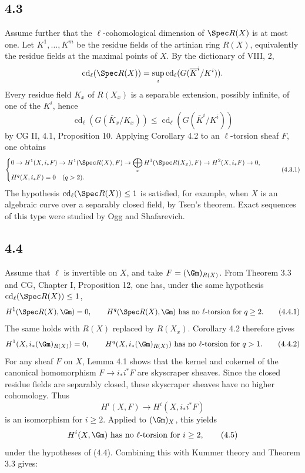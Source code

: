 \subsection*{4.3}
Assume further that the \(\ell\)-cohomological dimension of \(\Spec R(X)\) is at most one. Let \(K^1,\ldots,K^m\) be the residue fields of the artinian ring \(R(X)\), equivalently the residue fields at the maximal points of \(X\). By the dictionary of VIII, 2,
\[
\operatorname{cd}_\ell(\Spec R(X))=\sup_i\operatorname{cd}_\ell(G(\overline K^i/K^i)).
\]
Every residue field \(K_x\) of \(R(X_x)\) is a separable extension, possibly infinite, of one of the \(K^i\), hence
\[
\operatorname{cd}_\ell(G(\overline K_x/K_x))\leq \operatorname{cd}_\ell(G(\overline K^i/K^i))
\]
by CG II, 4.1, Proposition 10. Applying Corollary 4.2 to an \(\ell\)-torsion sheaf \(F\), one obtains
\[
\begin{cases}
0\to H^1(X,i_*F)\to H^1(\Spec R(X),F)\to \displaystyle\bigoplus_x H^1(\Spec R(X_x),F)\to H^2(X,i_*F)\to 0,\\
H^q(X,i_*F)=0\quad(q>2).
\end{cases}
\tag{4.3.1}
\]
The hypothesis \(\operatorname{cd}_\ell(\Spec R(X))\leq 1\) is satisfied, for example, when \(X\) is an algebraic curve over a separably closed field, by Tsen's theorem. Exact sequences of this type were studied by Ogg and Shafarevich.

\subsection*{4.4}
Assume that \(\ell\) is invertible on \(X\), and take \(F=(\Gm)_{R(X)}\). From Theorem 3.3 and CG, Chapter I, Proposition 12, one has, under the same hypothesis \(\operatorname{cd}_\ell(\Spec R(X))\leq 1\),
\[
H^1(\Spec R(X),\Gm)=0,
\qquad H^q(\Spec R(X),\Gm)\text{ has no }\ell\text{-torsion for }q\geq2.
\tag{4.4.1}
\]
The same holds with \(R(X)\) replaced by \(R(X_x)\). Corollary 4.2 therefore gives
\[
H^1(X,i_*(\Gm)_{R(X)})=0,
\qquad H^q(X,i_*(\Gm)_{R(X)})\text{ has no }\ell\text{-torsion for }q>1.
\tag{4.4.2}
\]
For any sheaf \(F\) on \(X\), Lemma 4.1 shows that the kernel and cokernel of the canonical homomorphism \(F\to i_*i^*F\) are skyscraper sheaves. Since the closed residue fields are separably closed, these skyscraper sheaves have no higher cohomology. Thus
\[
H^i(X,F)\longrightarrow H^i(X,i_*i^*F)
\]
is an isomorphism for \(i\geq2\). Applied to \((\Gm)_X\), this yields
\[
H^i(X,\Gm)\text{ has no }\ell\text{-torsion for }i\geq2,
\tag{4.5}
\]
under the hypotheses of (4.4). Combining this with Kummer theory and Theorem 3.3 gives:

